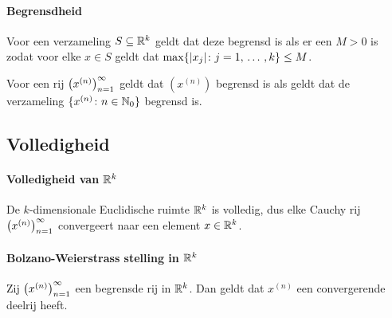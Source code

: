 \paragraph{Begrensdheid} Voor een verzameling \(S\subseteq \mathbb{R}^{k}\) geldt dat deze begrensd is als er een \(M>0\) is zodat voor elke \(x\in S\) geldt dat \(\max\{|x_{j}|\colon j=1,\,\dots\,,k\}\leq M\).

Voor een rij \(\left(x^{(n)}\right)_{n=1}^{\infty}\) geldt dat \((x^{(n)})\) begrensd is als geldt dat de verzameling \(\{x^{(n)}\colon n\in\mathbb{N}_{0}\}\) begrensd is.

\subsection{Volledigheid}

\paragraph{Volledigheid van \texorpdfstring{\(\mathbb{R}^{k}\)}{rk}} De \(k\)-dimensionale Euclidische ruimte \(\mathbb{R}^{k}\) is volledig, dus elke Cauchy rij \(\left(x^{(n)}\right)_{n=1}^{\infty}\) convergeert naar een element \(x\in\mathbb{R}^{k}\).

\paragraph{Bolzano-Weierstrass stelling in \texorpdfstring{\(\mathbb{R}^{k}\)}{rk}} Zij \(\left(x^{(n)}\right)_{n=1}^{\infty}\) een begrensde rij in \(\mathbb{R}^{k}\). Dan geldt dat \(x^{(n)}\) een convergerende deelrij heeft.